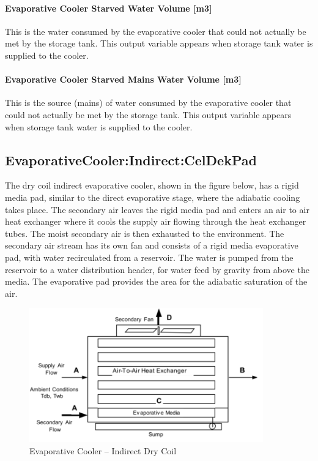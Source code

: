 \paragraph{Evaporative Cooler Starved Water Volume {[}m3{]}}\label{evaporative-cooler-starved-water-volume-m3-1}

This is the water consumed by the evaporative cooler that could not actually be met by the storage tank. This output variable appears when storage tank water is supplied to the cooler.

\paragraph{Evaporative Cooler Starved Mains Water Volume {[}m3{]}}\label{evaporative-cooler-starved-mains-water-volume-m3-1}

This is the source (mains) of water consumed by the evaporative cooler that could not actually be met by the storage tank. This output variable appears when storage tank water is supplied to the cooler.

\subsection{EvaporativeCooler:Indirect:CelDekPad}\label{evaporativecoolerindirectceldekpad}

The dry coil indirect evaporative cooler, shown in the figure below, has a rigid media pad, similar to the direct evaporative stage, where the adiabatic cooling takes place. The secondary air leaves the rigid media pad and enters an air to air heat exchanger where it cools the supply air flowing through the heat exchanger tubes. The moist secondary air is then exhausted to the environment. The secondary air stream has its own fan and consists of a rigid media evaporative pad, with water recirculated from a reservoir. The water is pumped from the reservoir to a water distribution header, for water feed by gravity from above the media. The evaporative pad provides the area for the adiabatic saturation of the air.

\begin{figure}[hbtp] %
\centering
\includegraphics[width=0.9\textwidth, height=0.9\textheight, keepaspectratio=true]{media/image419.png}
\caption{Evaporative Cooler -- Indirect Dry Coil \protect \label{fig:evaporative-cooler-indirect-dry-coil}}
\end{figure}

